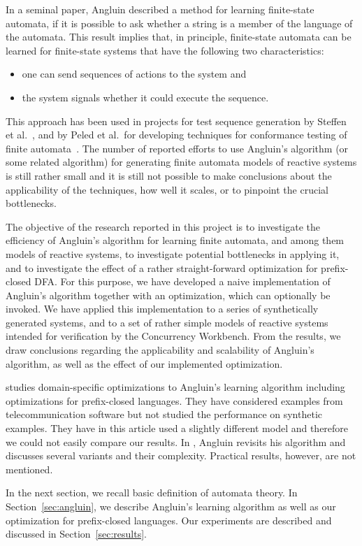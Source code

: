 In a seminal paper, Angluin \cite{Angluin:regset} described a method
for learning finite-state automata, if it is possible to ask whether a
string is a member of the language of the automata. This
result implies that, in principle, finite-state automata can be
learned for finite-state systems that have the following two
characteristics:
\begin{itemize}
\item one can send sequences of actions to the system and
\item the system signals whether it could execute the sequence.
\end{itemize}
This approach has been used in projects for test sequence generation
by Steffen et al.\ 
\cite{HHNS:modelgeneration}, and by Peled et al.\ for developing
techniques for conformance testing of finite
automata~\cite{GPY:adaptive}. 
The number of reported efforts to use Angluin's algorithm (or some
related algorithm) for generating finite automata models of reactive systems
is still rather small and it is still not possible to make
conclusions about the applicability of the techniques, how well it
scales, or to pinpoint the crucial bottlenecks.

The objective of the research reported in this project is to
investigate the efficiency of Angluin's algorithm for learning finite
automata, and among them models of reactive systems, to investigate
potential bottlenecks in applying it, and to investigate the effect of
a rather straight-forward optimization for prefix-closed DFA. For this
purpose, we have developed a naive implementation of Angluin's
algorithm together with an optimization, which can optionally be
invoked. We have applied this implementation to a series of
synthetically generated systems, and to a set of rather simple models
of reactive systems intended for verification by the Concurrency
Workbench. From the results, we draw conclusions regarding the
applicability and scalability of Angluin's algorithm, as well as the
effect of our implemented optimization.

\cite{HungarNS03} studies domain-specific optimizations to Angluin's
learning algorithm including optimizations for prefix-closed
languages. They have considered examples from telecommunication
software but not studied the performance on synthetic examples. They
have in this article used a slightly different model and therefore we
could not easily compare our results. In \cite{Angluin01}, Angluin
revisits his algorithm and discusses several variants and their
complexity. Practical results, however, are not mentioned.

In the next section, we recall basic definition of automata theory. In
Section~\ref{sec:angluin}, we describe Angluin's learning algorithm as
well as our optimization for prefix-closed languages. Our experiments
are described and discussed in Section~\ref{sec:results}.


